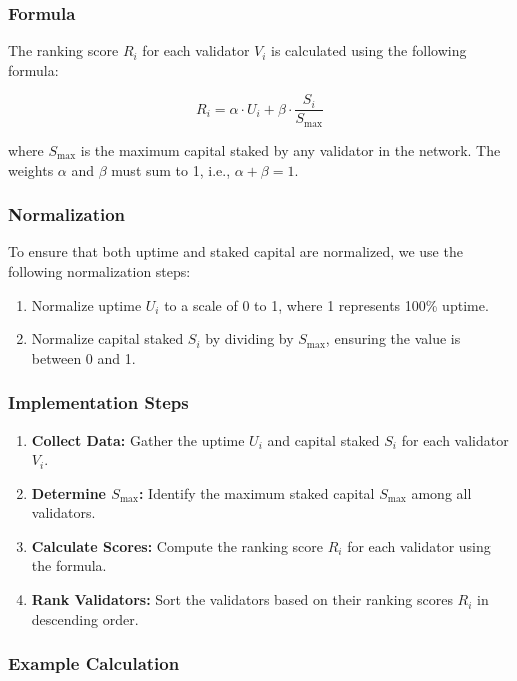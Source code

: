 \documentclass{article}
\begin{document}
\subsubsection{Formula}

The ranking score \( R_i \) for each validator \( V_i \) is calculated using the following formula:

\[
R_i = \alpha \cdot U_i + \beta \cdot \frac{S_i}{S_{\text{max}}}
\]

where \( S_{\text{max}} \) is the maximum capital staked by any validator in the network. The weights \( \alpha \) and \( \beta \) must sum to 1, i.e., \( \alpha + \beta = 1 \).

\subsubsection{Normalization}

To ensure that both uptime and staked capital are normalized, we use the following normalization steps:

\begin{enumerate}
    \item Normalize uptime \( U_i \) to a scale of 0 to 1, where 1 represents 100\% uptime.
    \item Normalize capital staked \( S_i \) by dividing by \( S_{\text{max}} \), ensuring the value is between 0 and 1.
\end{enumerate}

\subsubsection{Implementation Steps}

\begin{enumerate}
    \item \textbf{Collect Data:} Gather the uptime \( U_i \) and capital staked \( S_i \) for each validator \( V_i \).
    \item \textbf{Determine \( S_{\text{max}} \):} Identify the maximum staked capital \( S_{\text{max}} \) among all validators.
    \item \textbf{Calculate Scores:} Compute the ranking score \( R_i \) for each validator using the formula.
    \item \textbf{Rank Validators:} Sort the validators based on their ranking scores \( R_i \) in descending order.
\end{enumerate}

\subsubsection{Example Calculation}
\end{document}
